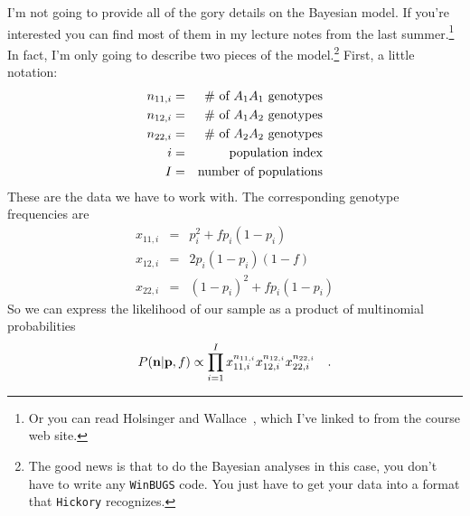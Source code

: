 I'm not going to provide all of the gory details on the Bayesian
model. If you're interested you can find most of them in my lecture
notes from the 
last summer.\footnote{Or you can read Holsinger and
  Wallace~\cite{Holsinger-Wallace-2004}, which I've linked to from the
  course web site.} In fact, I'm only going to describe two pieces of
the model.\footnote{The good news is that to do the Bayesian analyses
  in this case, you don't have to write any {\tt WinBUGS} code. You
  just have to get your data into a format that {\tt Hickory}
  recognizes.} First, a little notation:
\begin{eqnarray*}
n_{11,i} &=& \hbox{\# of $A_1A_1$ genotypes} \\
n_{12,i} &=& \hbox{\# of $A_1A_2$ genotypes} \\
n_{22,i} &=& \hbox{\# of $A_2A_2$ genotypes} \\
i         &=& \hbox{population index} \\
I         &=& \hbox{number of populations} \\
\end{eqnarray*}
These are the data we have to work with. The corresponding genotype
frequencies are
\begin{eqnarray*}
x_{11,i} &=& p_{i}^2 + fp_{i}(1-p_{i}) \\
x_{12,i} &=& 2p_{i}(1-p_{i})(1-f) \\
x_{22,i} &=& (1-p_{i})^2 + fp_{i}(1-p_{i})
\end{eqnarray*}
So we can express the likelihood of our sample as a product of
multinomial probabilities
\[
P({\bf n}|{\bf p},f) \propto \prod_{i=1}^I x_{11,i}^{n_{11,i}}
x_{12,i}^{n_{12,i}} x_{22,i}^{n_{22,i}} \quad .
\]

